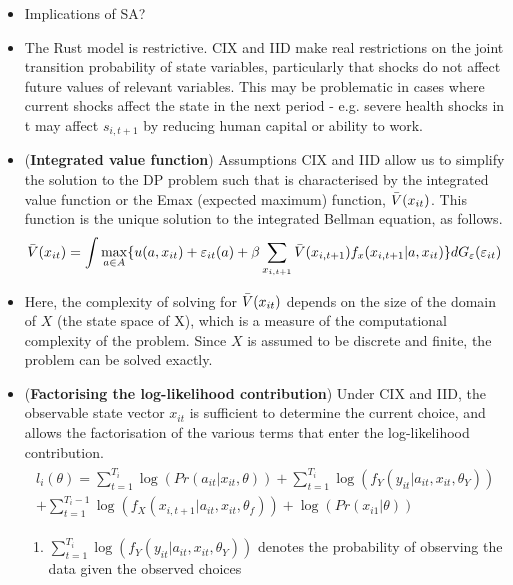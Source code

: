 \documentclass[11pt]{article}
\begin{document}
\begin{itemize}
    \item Implications of SA? 
    \item The Rust model is restrictive. CIX and IID make real restrictions on the joint transition probability of state variables, particularly that shocks do not affect future values of relevant variables. This may be problematic in cases where current shocks affect the state in the next period - e.g. severe health shocks in t may affect $s_{i,t+1}$ by reducing human capital or ability to work.
    \item (\textbf{Integrated value function}) Assumptions CIX and IID allow us to simplify the solution to the DP problem such that is characterised by the integrated value function or the Emax (expected maximum) function, $\Bar{V}(x_{it})$. This function is the unique solution to the integrated Bellman equation, as follows.
    \begin{equation}
        \Bar{V}(x_{it}) = \int \max_{a \in A} \{u(a,x_{it}) + \varepsilon_{it}(a)+ \beta \sum_{x_{i,t+1}} \Bar{V}(x_{i,t+1}) f_x(x_{i,t+1}|a,x_{it})\} dG_\varepsilon(\varepsilon_{it})
    \end{equation}
    \item Here, the complexity of solving for $\Bar{V}(x_{it})$ depends on the size of the domain of $X$ (the state space of X), which is a measure of the computational complexity of the problem. Since $X$ is assumed to be discrete and finite, the problem can be solved exactly.
    \item (\textbf{Factorising the log-likelihood contribution}) Under CIX and IID, the observable state vector $x_{it}$ is sufficient to determine the current choice, and allows the factorisation of the various terms that enter the log-likelihood contribution. 
    \begin{align}
        \begin{split}
         l_i(\theta) = \sum_{t=1}^{T_i} \log(Pr(a_{it}|x_{it},\theta))+ \sum_{t=1}^{T_i} \log(f_Y(y_{it}|a_{it},x_{it},\theta_Y)) \\
         + \sum_{t=1}^{T_i - 1}\log(f_X(x_{i,t+1}|a_{it},x_{it},\theta_f)) + \log(Pr(x_{i1}|\theta))           
        \end{split}
    \end{align}
    \begin{enumerate}
        \item $\sum_{t=1}^{T_i} \log(f_Y(y_{it}|a_{it},x_{it},\theta_Y))$ denotes the probability of observing the data given the observed choices

\end{enumerate}
\end{itemize}
\end{document}
